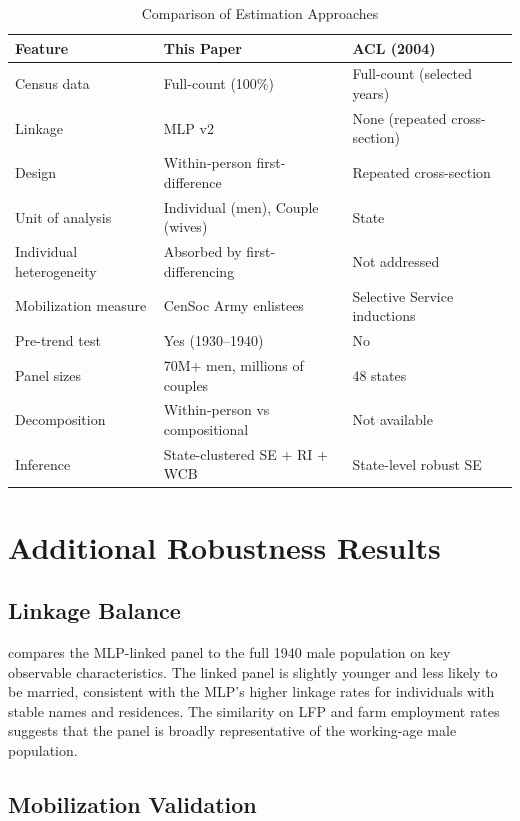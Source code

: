 \documentclass[12pt]{article}
\begin{document}
\begin{table}[htbp]
\centering
\caption{Comparison of Estimation Approaches}
\label{tab:comparison}
\small
\begin{tabular}{p{4cm}p{5.5cm}p{5.5cm}}
\hline\hline
Feature & This Paper & ACL (2004) \\
\hline
Census data & Full-count (100\%) & Full-count (selected years) \\
Linkage & MLP v2 \citep{helgertz2023mlp} & None (repeated cross-section) \\
Design & Within-person first-difference & Repeated cross-section \\
Unit of analysis & Individual (men), Couple (wives) & State \\
Individual heterogeneity & Absorbed by first-differencing & Not addressed \\
Mobilization measure & CenSoc Army enlistees & Selective Service inductions \\
Pre-trend test & Yes (1930--1940) & No \\
Panel sizes & 70M+ men, millions of couples & 48 states \\
Decomposition & Within-person vs compositional & Not available \\
Inference & State-clustered SE + RI + WCB & State-level robust SE \\
\hline\hline
\end{tabular}
\end{table}


\section{Additional Robustness Results}
\label{app:robustness}

\subsection{Linkage Balance}

 compares the MLP-linked panel to the full 1940 male population on key observable characteristics. The linked panel is slightly younger and less likely to be married, consistent with the MLP's higher linkage rates for individuals with stable names and residences. The similarity on LFP and farm employment rates suggests that the panel is broadly representative of the working-age male population.



\subsection{Mobilization Validation}
\end{document}
